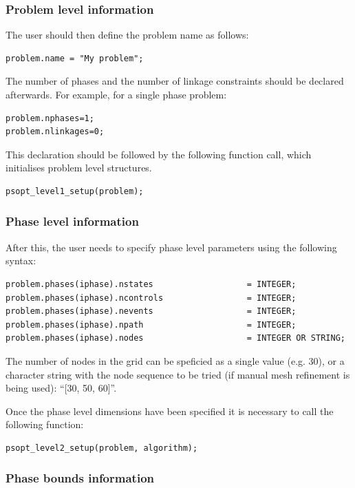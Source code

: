 \documentclass[a4paper,11pt]{report}    %
\begin{document}
\subsubsection{Problem level information}

The user should then define the problem name as follows:

\begin{verbatim}
problem.name = "My problem";
\end{verbatim}


The number of phases and the number of linkage constraints should be declared afterwards. For example,
for a single phase problem:
\begin{verbatim}
problem.nphases=1;
problem.nlinkages=0;
\end{verbatim}

This declaration should be followed by the following function call, which initialises
problem level structures.

\begin{verbatim}
psopt_level1_setup(problem);
\end{verbatim}

\subsubsection{Phase level information}

After this, the user needs to specify phase level parameters using the
following syntax:

\begin{verbatim}
problem.phases(iphase).nstates                   = INTEGER;
problem.phases(iphase).ncontrols                 = INTEGER;
problem.phases(iphase).nevents                   = INTEGER;
problem.phases(iphase).npath                     = INTEGER;
problem.phases(iphase).nodes                     = INTEGER OR STRING;
\end{verbatim}

The number of nodes in the grid can be speficied as a single value (e.g. 30),
or a character string with the node sequence to be tried (if manual mesh refinement
is being used): ``[30, 50, 60]''.

Once the phase level dimensions have been specified it is
necessary to call the following function:

\begin{verbatim}
psopt_level2_setup(problem, algorithm); 
\end{verbatim}

\subsubsection{Phase bounds information}
\end{document}
